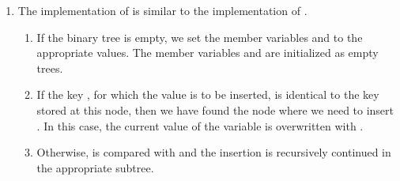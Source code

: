 \begin{enumerate}
\begin{figure}[!ht]
  \centering
\begin{verbatim}
    class OrderedBinaryTree:
        def __init__(self):
            self.mKey   = None
            self.mValue = None
            self.mLeft  = None
            self.mRight = None
    
        def isEmpty(self):
            return self.mKey == None
    
        def find(self, key):
            if self.isEmpty():
                return None
            elif self.mKey == key:
                return self.mValue
            elif key < self.mKey:
                return self.mLeft.find(key)
            else:
                return self.mRight.find(key)
    
        def insert(self, key, value):
            if self.isEmpty():
                self.mKey   = key
                self.mValue = value
                self.mLeft  = OrderedBinaryTree()
                self.mRight = OrderedBinaryTree()
            elif self.mKey == key:
                self.mValue = value
            elif key < self.mKey:
                self.mLeft.insert(key, value)
            else:
                self.mRight.insert(key, value)
\end{verbatim}
\vspace*{-0.3cm}
  \caption{Implementation of ordered binary trees in \textsl{Python}, part .}
  \label{fig:binary-tree.py-1}
\end{figure}
\item The implementation of  is similar to the implementation of .
      \begin{enumerate}
      \item If the binary tree is empty, we set the member variables  and
             to the appropriate values.  The member variables  and 
             are initialized as empty trees.
      \item If the key , for which the value  is to be inserted, is identical
            to the key  stored at this node, then we have found the node where we need
            to insert .  In this case, the current value of the variable  is
            overwritten with . 
      \item Otherwise,  is compared with  and the insertion is recursively continued in the
            appropriate subtree.
      \end{enumerate}      



\end{enumerate}
